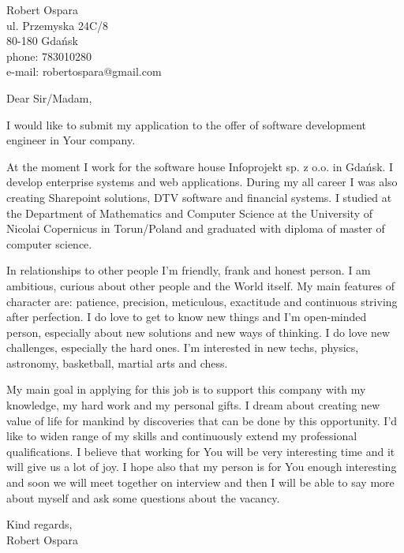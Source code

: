 \documentclass[a4paper,12pt]{letter}
\begin{document}
 
\begin{letter}{Robert Ospara \\ ul. Przemyska 24C/8 \\ 80-180 Gda\'{n}sk \\ phone: 783010280 \\ e-mail: robertospara@gmail.com}


\opening{Dear Sir/Madam,} 
 
I would like to submit my application to the offer of software development engineer
in Your company.

At the moment I work for the software house Infoprojekt sp. z o.o. in Gda\'{n}sk. I develop enterprise systems and web applications.
During my all career I was also creating Sharepoint solutions, DTV software and financial systems. 
I studied at the Department of Mathematics and Computer Science at the University of Nicolai Copernicus in Torun/Poland and graduated with 
diploma of master of computer science.

In relationships to other people I'm friendly, frank and honest person.
I am ambitious, curious about other people and the World itself. My main features of character are: patience, 
precision, meticulous, exactitude and continuous striving after perfection. I do love to get to know new things and 
I’m open-minded person, especially about new solutions and new ways of thinking. I do love new challenges, especially the hard ones. 
I’m interested in new techs, physics, astronomy, basketball, martial arts and chess. 

My main goal in applying for this job is to support this company with my knowledge, my hard work and my personal gifts. 
I dream about creating new value of life for mankind by discoveries that can be done by this opportunity. 
I'd like to widen range of my skills and continuously extend my professional qualifications. 
I believe that working for You will be very interesting time and it will give us a lot of joy. 
I hope also that my person is for You enough interesting and soon we will meet together on interview and then 
I will be able to say more about myself and ask some questions about the vacancy.
 
Kind regards, \\
Robert Ospara 


\end{letter}
\end{document}
